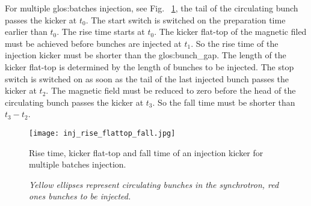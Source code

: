 For multiple \gls{glos:batch}es injection, see Fig. ~\ref{inj_rise_flattop_fall}, the tail of the circulating bunch passes the kicker at $t_0$. The start switch is switched on the preparation time earlier than $t_0$. The rise time starts at $t_0$.  The kicker flat-top of the magnetic filed must be achieved before bunches are injected at $t_1$. So the rise time of the injection kicker must be shorter than the \gls{glos:bunch_gap}. The length of the kicker flat-top is determined by the length of bunches to be injected. The stop switch is switched on as soon as the tail of the last injected bunch passes the kicker at $t_2$. The magnetic field must be reduced to zero before the head of the circulating bunch passes the kicker at $t_3$. So the fall time must be shorter than $t_3-t_2$.

\begin{figure}[!htb]
   \centering   
   \texttt{[image: inj\_rise\_flattop\_fall.jpg]}
   \caption{Rise time, kicker flat-top and fall time of an injection kicker for multiple batches injection.}
	\caption*{\textsl{\small{Yellow ellipses represent circulating bunches in the synchrotron, red ones bunches to be injected.}}}
   \label{inj_rise_flattop_fall}
\end{figure}

%


%
%


